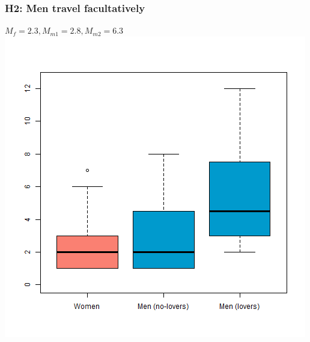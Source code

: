 \documentclass{beamer}
\begin{document}
\begin{frame}
\frametitle{H2: Men travel facultatively}

\centering
\textbf{$M_{f}=2.3, M_{m1}=2.8, M_{m2}=6.3$}
\includegraphics[width= .7\textwidth]{boxtot_rmv}

\end{frame}

\end{document}
